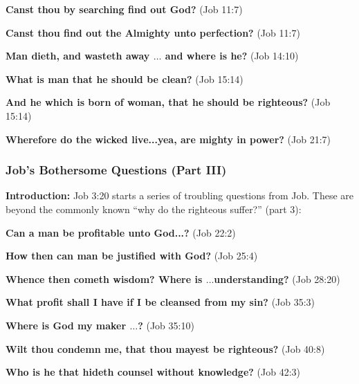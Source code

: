 \begin{compactenum}[I.][19]
    \item  \textbf{Canst thou by searching find out God?} (Job 11:7)
    \item  \textbf{Canst thou find out the Almighty unto perfection?} (Job 11:7)
    \item  \textbf{Man dieth, and wasteth away $\hdots$ and where is he?} (Job 14:10)
    \item  \textbf{What is man that he should be clean?} (Job 15:14)
    \item  \textbf{And he which is born of woman, that he should be righteous?} (Job 15:14)
    \item  \textbf{Wherefore do the wicked live...yea, are mighty in power?} (Job 21:7)
\end{compactenum}

\subsubsection{Job's Bothersome Questions (Part III)}
\textbf{Introduction:} Job 3:20 starts a series of troubling questions from Job. These are beyond the commonly known ``why do the righteous suffer?'' (part 3):

\begin{compactenum}[I.][7]
    \item  \textbf{Can a man be profitable unto God...?} (Job 22:2)
    \item  \textbf{How then can man be justified with God?} (Job 25:4)
    \item  \textbf{Whence then cometh wisdom? Where is $\hdots$understanding?} (Job 28:20)
    \item  \textbf{What profit shall I have if I be cleansed from my sin?} (Job 35:3)
    \item  \textbf{Where is God my maker $\hdots$?} (Job 35:10)
    \item  \textbf{Wilt thou condemn me, that thou mayest be righteous?} (Job 40:8)
    \item  \textbf{Who is he that hideth counsel without knowledge?} (Job 42:3)
\end{compactenum}
